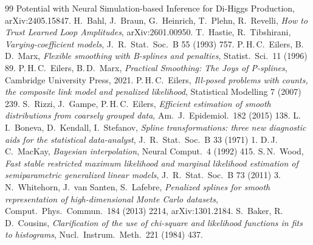 \begin{thebibliography}{99}
{  Potential with Neural Simulation-based Inference for Di-Higgs Production},
  arXiv:2405.15847.
 H.~Bahl, J.~Braun, G.~Heinrich, T.~Plehn, R.~Revelli, \emph{How to Trust
  Learned Loop Amplitudes}, arXiv:2601.00950.
 T.~Hastie, R.~Tibshirani, \emph{Varying-coefficient models},
  J.\ R.\ Stat.\ Soc.\ B 55 (1993) 757.
 P.\,H.\,C.~Eilers, B.\,D.~Marx, \emph{Flexible smoothing with
  B-splines and penalties}, Statist.\ Sci.\ 11 (1996) 89.
 P.\,H.\,C.~Eilers, B.\,D.~Marx, \emph{Practical Smoothing: The Joys
  of P-splines}, Cambridge University Press, 2021.
 P.\,H.\,C.~Eilers, \emph{Ill-posed problems with counts, the composite
  link model and penalized likelihood}, Statistical Modelling 7 (2007) 239.
 S.~Rizzi, J.~Gampe, P.\,H.\,C.~Eilers, \emph{Efficient estimation of
  smooth distributions from coarsely grouped data}, Am.\ J.\ Epidemiol.\ 182 (2015) 138.
 L.\,I.~Boneva, D.~Kendall, I.~Stefanov, \emph{Spline transformations:
  three new diagnostic aids for the statistical data-analyst}, J.\ R.\ Stat.\ Soc.\ B 33
  (1971) 1.
 D.\,J.\,C.~MacKay, \emph{Bayesian interpolation}, Neural Comput.\ 4
  (1992) 415.
 S.\,N.~Wood, \emph{Fast stable restricted maximum likelihood and marginal
  likelihood estimation of semiparametric generalized linear models}, J.\ R.\ Stat.\ Soc.\ B
  73 (2011) 3.
 N.~Whitehorn, J.~van Santen, S.~Lafebre, \emph{Penalized splines for
  smooth representation of high-dimensional Monte Carlo datasets}, Comput.\ Phys.\ Commun.\
  184 (2013) 2214, arXiv:1301.2184.
 S.~Baker, R.\,D.~Cousins, \emph{Clarification of the use of
  chi-square and likelihood functions in fits to histograms}, Nucl.\ Instrum.\ Meth.\ 221
  (1984) 437.
\end{thebibliography}
